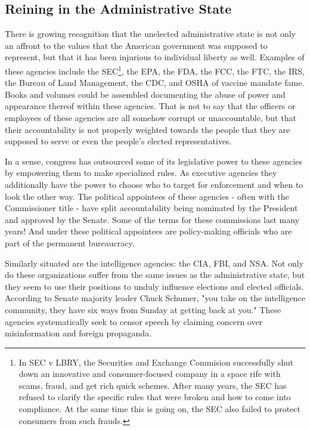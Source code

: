\documentclass{article}
\begin{document}
\subsection{Reining in the Administrative State}

There is growing recognition that the unelected administrative state is not only an affront to the values that the American government was supposed to represent, but that it has been injurious to individual liberty as well. Examples of these agencies include the SEC\footnote{In SEC v LBRY, the Securities and Exchange Commision successfully shut down\cite{Barash} an innovative and consumer-focused company in a space rife with scams, fraud, and get rich quick schemes. After many years, the SEC has refused to clarify the specific rules that were broken and how to come into compliance. At the same time this is going on, the SEC also failed to protect consumers from such frauds.}, the EPA, the FDA, the FCC, the FTC, the IRS, the Bureau of Land Management, the CDC, and OSHA of vaccine mandate fame. Books and volumes could be assembled documenting the abuse of power and appearance thereof within these agencies. That is not to say that the officers or employees of these agencies are all somehow corrupt or unaccountable, but that their accountability is not properly weighted towards the people that they are supposed to serve or even the people's elected representatives.

In a sense, congress has outsourced some of its legislative power to these agencies by empowering them to make specialized rules. As executive agencies they additionally have the power to choose who to target for enforcement and when to look the other way. The political appointees of these agencies - often with the Commissioner title - have split accountability being nominated by the President and approved by the Senate. Some of the terms for these commissions last many years! And under these political appointees are policy-making officials who are part of the permanent bureaucracy.

Similarly situated are the intelligence agencies: the CIA, FBI, and NSA. Not only do these organizations suffer from the same issues as the administrative state, but they seem to use their positions to unduly influence elections and elected officials. According to Senate majority leader Chuck Schumer\cite{Stanley}, "you take on the intelligence community, they have six ways from Sunday at getting back at you." These agencies systematically seek to censor speech by claiming concern over misinformation and foreign propaganda\cite{Beanz}.
\end{document}

